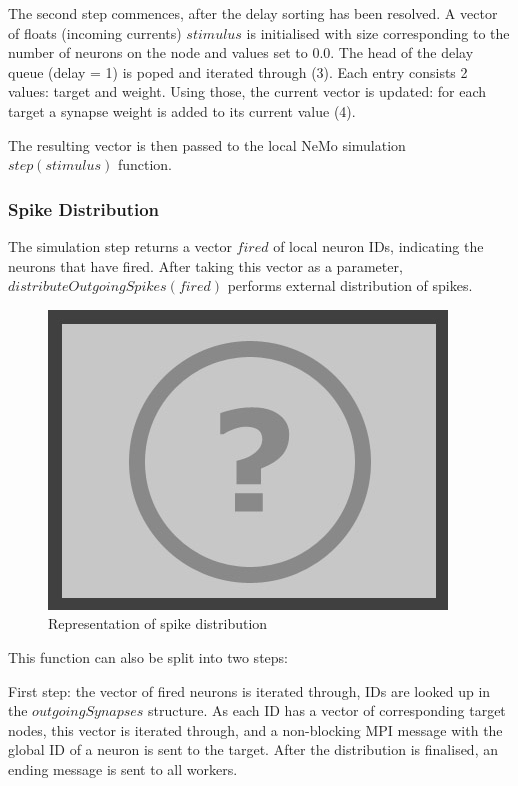 The second step commences, after the delay sorting has been resolved. A vector of floats (incoming currents) $stimulus$ is initialised with size corresponding to the number of neurons on the node and values set to 0.0. The head of the delay queue (delay = 1) is poped and iterated through (3). Each entry consists 2 values: target and weight. Using those, the current vector is updated: for each target a synapse weight is added to its current value (4).

The resulting vector is then passed to the local NeMo simulation $step(stimulus)$ function.

\subsubsection{Spike Distribution}

The simulation step returns a vector $fired$ of local neuron IDs, indicating the neurons that have fired. After taking this vector as a parameter, $distributeOutgoingSpikes(fired)$ performs external distribution of spikes.

\begin{figure}[h]
\begin{center}
\includegraphics[scale = 0.5]{images/placeholder.png}
\end{center}
\caption{Representation of spike distribution}
\end{figure}

This function can also be split into two steps:

First step: the vector of fired neurons is iterated through, IDs are looked up in the $outgoingSynapses$ structure. As each ID has a vector of corresponding target nodes, this vector is iterated through, and a non-blocking MPI message with the global ID of a neuron is sent to the target. After the distribution is finalised, an ending message is sent to all workers.

